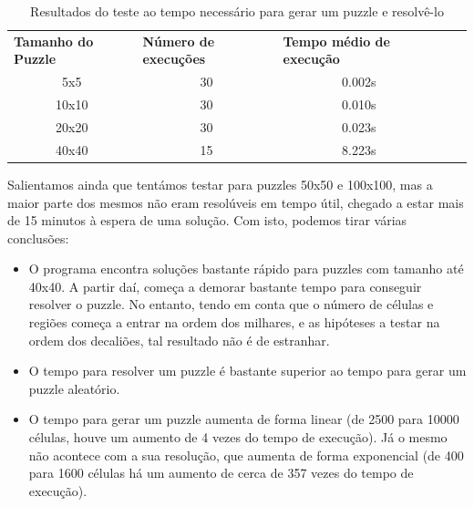 \documentclass[runningheads,a4paper]{llncs}
\begin{document}
\begin{table}[]
\centering
\begin{tabular}{cccll}
\multicolumn{1}{l}{\textbf{Tamanho do Puzzle}} & \multicolumn{1}{l}{\textbf{Número de execuções}} & \multicolumn{1}{l}{\textbf{Tempo médio de execução}} &  &  \\
5x5                                            & 30                                               & 0.002s                                               &  &  \\
10x10                                          & 30                                               & 0.010s                                               &  &  \\
20x20                                          & 30                                               & 0.023s                                               &  &  \\
40x40                                          & 15                                               & 8.223s                                               &  & 
\end{tabular}
\caption{Resultados do teste ao tempo necessário para gerar um puzzle e resolvê-lo}
\label{gemegeneratorandsolver}
\end{table}

Salientamos ainda que tentámos testar para puzzles 50x50 e 100x100, mas a maior parte dos mesmos não eram resolúveis em tempo útil, chegado a estar mais de 15 minutos à espera de uma solução. Com isto, podemos tirar várias conclusões:

\begin{itemize}
\item O programa encontra soluções bastante rápido para puzzles com tamanho até 40x40. A partir daí, começa a demorar bastante tempo para conseguir resolver o puzzle. No entanto, tendo em conta que o número de células e regiões começa a entrar na ordem dos milhares, e as hipóteses a testar na ordem dos decaliões, tal resultado não é de estranhar.
\item O tempo para resolver um puzzle é bastante superior ao tempo para gerar um puzzle aleatório.
\item O tempo para gerar um puzzle aumenta de forma linear (de 2500 para 10000 células, houve um aumento de 4 vezes do tempo de execução). Já o mesmo não acontece com a sua resolução, que aumenta de forma exponencial (de 400 para 1600 células há um aumento de cerca de 357 vezes do tempo de execução).
\end{itemize}
\end{document}
